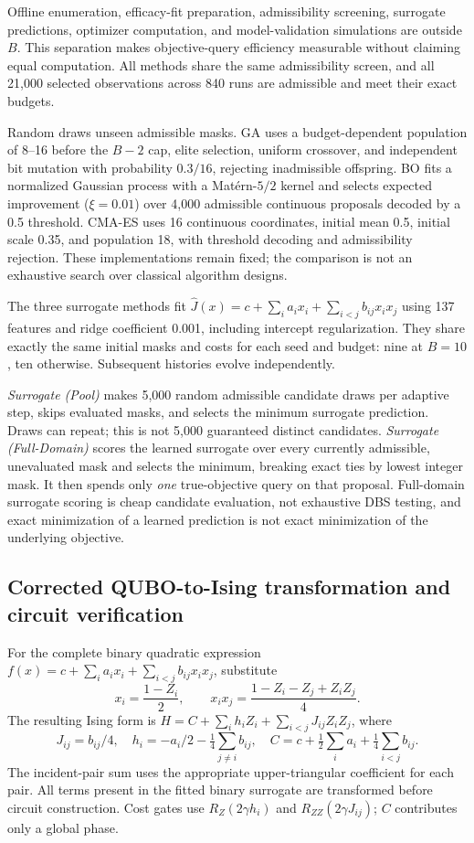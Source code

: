 \documentclass[11pt,letterpaper]{article}
\newcommand{\fd}{Surrogate (Full-Domain)}
\begin{document}
Offline enumeration, efficacy-fit preparation, admissibility screening, surrogate predictions, optimizer computation, and model-validation simulations are outside $B$. This separation makes objective-query efficiency measurable without claiming equal computation. All methods share the same admissibility screen, and all 21,000 selected observations across 840 runs are admissible and meet their exact budgets.

Random draws unseen admissible masks. GA uses a budget-dependent population of 8--16 before the $B-2$ cap, elite selection, uniform crossover, and independent bit mutation with probability $0.3/16$, rejecting inadmissible offspring. BO fits a normalized Gaussian process with a Mat\'ern-$5/2$ kernel and selects expected improvement ($\xi=0.01$) over 4,000 admissible continuous proposals decoded by a 0.5 threshold. CMA-ES uses 16 continuous coordinates, initial mean 0.5, initial scale 0.35, and population 18, with threshold decoding and admissibility rejection. These implementations remain fixed; the comparison is not an exhaustive search over classical algorithm designs.

The three surrogate methods fit $\widehat J(x)=c+\sum_i a_i x_i+\sum_{i<j}b_{ij}x_ix_j$ using 137 features and ridge coefficient 0.001, including intercept regularization. They share exactly the same initial masks and costs for each seed and budget: nine at $B=10$, ten otherwise. Subsequent histories evolve independently.

\emph{Surrogate (Pool)} makes 5,000 random admissible candidate draws per adaptive step, skips evaluated masks, and selects the minimum surrogate prediction. Draws can repeat; this is not 5,000 guaranteed distinct candidates. \emph{\fd} scores the learned surrogate over every currently admissible, unevaluated mask and selects the minimum, breaking exact ties by lowest integer mask. It then spends only \emph{one} true-objective query on that proposal. Full-domain surrogate scoring is cheap candidate evaluation, not exhaustive DBS testing, and exact minimization of a learned prediction is not exact minimization of the underlying objective.

\subsection{Corrected QUBO-to-Ising transformation and circuit verification}
For the complete binary quadratic expression $f(x)=c+\sum_i a_ix_i+\sum_{i<j}b_{ij}x_ix_j$, substitute
\begin{equation}
x_i=\frac{1-Z_i}{2},\qquad x_ix_j=\frac{1-Z_i-Z_j+Z_iZ_j}{4}.
\end{equation}
The resulting Ising form is $H=C+\sum_i h_iZ_i+\sum_{i<j}J_{ij}Z_iZ_j$, where
\begin{equation}
J_{ij}=b_{ij}/4,\quad h_i=-a_i/2-\tfrac14\sum_{j\ne i}b_{ij},\quad
C=c+\tfrac12\sum_i a_i+\tfrac14\sum_{i<j}b_{ij}.
\end{equation}
The incident-pair sum uses the appropriate upper-triangular coefficient for each pair. All terms present in the fitted binary surrogate are transformed before circuit construction. Cost gates use $R_Z(2\gamma h_i)$ and $R_{ZZ}(2\gamma J_{ij})$; $C$ contributes only a global phase.
\end{document}
